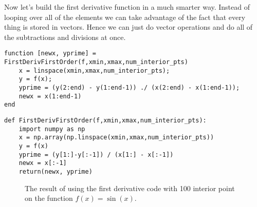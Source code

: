 \begin{example}
Now let's build the first derivative function in a much smarter way.  Instead of looping
over all of the elements we can take advantage of the fact that every thing is stored in
vectors.  Hence we can just do vector operations and do all of the subtractions and
divisions at once.
\ifnum{}
\begin{lstlisting}
function [newx, yprime] = FirstDerivFirstOrder(f,xmin,xmax,num_interior_pts)
    x = linspace(xmin,xmax,num_interior_pts);
    y = f(x);
    yprime = (y(2:end) - y(1:end-1)) ./ (x(2:end) - x(1:end-1));
    newx = x(1:end-1)
end
\end{lstlisting}
\else
\begin{lstlisting}
def FirstDerivFirstOrder(f,xmin,xmax,num_interior_pts):
    import numpy as np
    x = np.array(np.linspace(xmin,xmax,num_interior_pts))
    y = f(x)
    yprime = (y[1:]-y[:-1]) / (x[1:] - x[:-1])
    newx = x[:-1]
    return(newx, yprime)
\end{lstlisting}
\fi


\end{example}

\begin{figure}[ht!]
    \begin{center}
    \end{center}
    \caption{The result of using the first derivative code with 100 interior point on the
    function $f(x) = \sin(x)$.}
    \label{fig:first_deriv_sine}
\end{figure}


